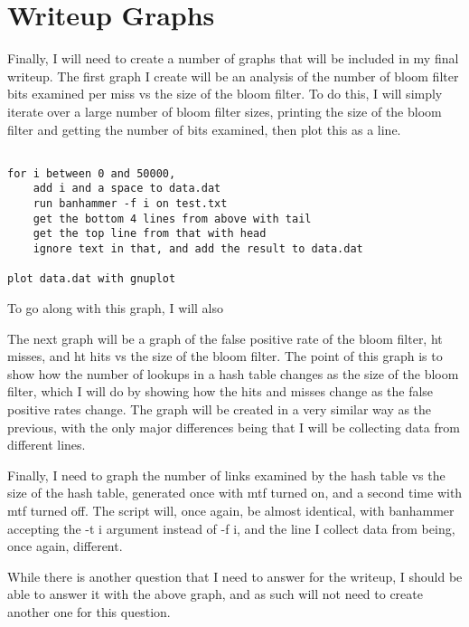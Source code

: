 \documentclass[11pt]{article}
\begin{document}
\section{Writeup Graphs}

Finally, I will need to create a number of graphs that will be included in my final writeup. The first graph I create will be an analysis of the number of bloom filter bits examined per miss vs the size of the bloom filter. To do this, I will simply iterate over a large number of bloom filter sizes, printing the size of the bloom filter and getting the number of bits examined, then plot this as a line.

\begin{verbatim}

for i between 0 and 50000,
    add i and a space to data.dat
    run banhammer -f i on test.txt
    get the bottom 4 lines from above with tail
    get the top line from that with head
    ignore text in that, and add the result to data.dat

plot data.dat with gnuplot

\end{verbatim}

To go along with this graph, I will also

The next graph will be a graph of the false positive rate of the bloom filter, ht misses, and ht hits vs the size of the bloom filter. The point of this graph is to show how the number of lookups in a hash table changes as the size of the bloom filter, which I will do by showing how the hits and misses change as the false positive rates change. The graph will be created in a very similar way as the previous, with the only major differences being that I will be collecting data from different lines.

Finally, I need to graph the number of links examined by the hash table vs the size of the hash table, generated once with mtf turned on, and a second time with mtf turned off. The script will, once again, be almost identical, with banhammer accepting the -t i argument instead of -f i, and the line I collect data from being, once again, different.

While there is another question that I need to answer for the writeup, I should be able to answer it with the above graph, and as such will not need to create another one for this question.
\end{document}

